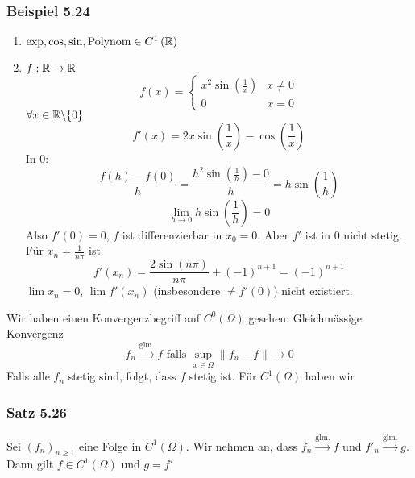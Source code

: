 \subsubsection*{Beispiel 5.24}
\begin{enumerate}
\item $\exp,\cos,\sin,\text{Polynom}\in C^1\left( \mathbb{R}\right)$
\item $f:\mathbb{R}\to\mathbb{R}$
\[f\left( x \right) = \left\{ {\begin{array}{*{20}{c}}
{{x^2}\sin \left( {\frac{1}{x}} \right)}&{x\not  = 0}\\
0&{x = 0}
\end{array}} \right.\]
$\forall x\in\mathbb{R}\backslash\{ 0\}$
\[f'\left( x \right) = 2x\sin \left( {\frac{1}{x}} \right) - \cos \left( {\frac{1}{x}} \right)\]
\underline{In 0:}
\[\frac{{f\left( h \right) - f\left( 0 \right)}}{h} = \frac{{{h^2}\sin \left( {\frac{1}{h}} \right) - 0}}{h} = h\sin \left( {\frac{1}{h}} \right)\]
\[\mathop {\lim }\limits_{h \to 0} h\sin \left( {\frac{1}{h}} \right) = 0\]
Also $f'(0)=0$, $f$ ist differenzierbar in $x_0=0$. Aber $f'$ ist in 0 nicht stetig. Für $x_n=\frac{1}{n\pi}$ ist
\[f'\left( {{x_n}} \right) = \frac{{2\sin \left( {n\pi } \right)}}{{n\pi }} + {\left( { - 1} \right)^{n + 1}} = {\left( { - 1} \right)^{n + 1}}\]
$\lim x_n=0$, $\lim f'\left( x_n\right)$ (insbesondere $\not=f'(0)$) nicht existiert.
\end{enumerate}
Wir haben einen Konvergenzbegriff auf $C^0\left( \Omega\right)$ gesehen: Gleichmässige Konvergenz
\[{f_n}\mathop  \to \limits^{\text{glm.}} f{\text{ falls }}\mathop {\sup }\limits_{x \in \Omega } \left\| {{f_n} - f} \right\| \to 0\]
Falls alle $f_n$ stetig sind, folgt, dass $f$ stetig ist. Für $C^1\left( \Omega\right)$ haben wir

\subsubsection*{Satz 5.26}\label{satz5.26}
Sei $\left( f_n\right)_{n\geq 1}$ eine Folge in $C^1\left( \Omega\right)$. Wir nehmen an, dass ${f_n}\mathop  \to \limits^{\text{glm.}} f$ und ${f'_n}\mathop  \to \limits^{\text{glm.}} g$. Dann gilt $f\in C^1\left( \Omega\right)$ und $g=f'$

